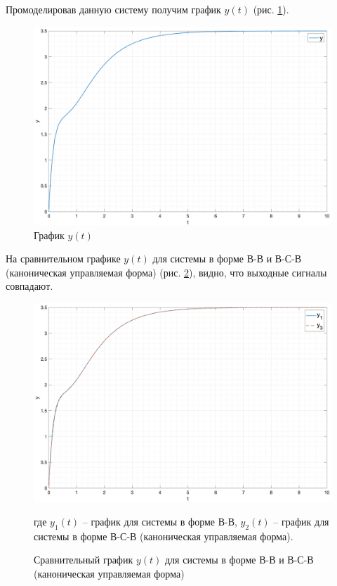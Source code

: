 Промоделировав данную систему получим график $y(t)$ (рис. \ref{fig:yt3}).
\begin{figure}[ht!]
    \centering
    \includegraphics[width=\textwidth]{media/sys3_y(t).png}
    \caption{График $y(t)$}
    \label{fig:yt3}
\end{figure}
\FloatBarrier

На сравнительном графике $y(t)$ для системы в форме В-В и В-С-В (каноническая управляемая форма) (рис. \ref{fig:cmp_sys1_sys3}), видно, что выходные сигналы 
совпадают. 

\begin{figure}[ht!]
    \centering
    \includegraphics[width=\textwidth]{media/cmp_sys1_sys3.png}
    \caption{Сравнительный график $y(t)$ для системы в форме В-В и В-С-В (каноническая управляемая форма)}
    \label{fig:cmp_sys1_sys3}
    где $y_1(t)$ -- график для системы в форме В-В, $y_2(t)$ -- график для системы в форме В-С-В (каноническая управляемая форма).
\end{figure}


